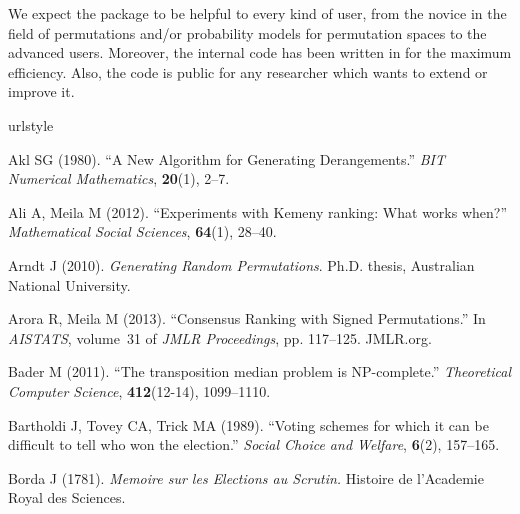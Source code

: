 \documentclass[article,nojss]{jss}
\begin{document}
We expect the  package to be helpful to every kind of user, from the novice in the field of permutations and/or probability models for permutation spaces to the advanced users. Moreover, the internal code has been written in  for the maximum efficiency. Also, the code is public for any researcher which wants to extend or improve it. 



%
%

\begin{thebibliography}{44}
\newcommand{\enquote}[1]{``#1''}
\providecommand{\natexlab}[1]{#1}
\providecommand{\url}[1]{}
\providecommand{\urlprefix}{}
\expandafter\ifx\csname urlstyle\endcsname\relax
  \providecommand{\doi}[1]{doi:\discretionary{}{}{}#1}\else
  \providecommand{\doi}{doi:\discretionary{}{}{}\begingroup
  \urlstyle{rm}\Url}\fi
\providecommand{\eprint}[2][]{\url{#2}}

Akl SG (1980).
\newblock \enquote{{A New Algorithm for Generating Derangements}.}
\newblock \emph{BIT Numerical Mathematics}, \textbf{20}(1), 2--7.

Ali A, Meila M (2012).
\newblock \enquote{{Experiments with Kemeny ranking: What works when?}}
\newblock \emph{Mathematical Social Sciences}, \textbf{64}(1), 28--40.

Arndt J (2010).
\newblock \emph{{Generating Random Permutations}}.
\newblock Ph.D. thesis, Australian National University.

Arora R, Meila M (2013).
\newblock \enquote{{Consensus Ranking with Signed Permutations}.}
\newblock In \emph{AISTATS}, volume~31 of \emph{JMLR Proceedings}, pp.
  117--125. JMLR.org.

Bader M (2011).
\newblock \enquote{{The transposition median problem is NP-complete.}}
\newblock \emph{Theoretical Computer Science}, \textbf{412}(12-14), 1099--1110.

Bartholdi J, Tovey CA, Trick MA (1989).
\newblock \enquote{{Voting schemes for which it can be difficult to tell who
  won the election}.}
\newblock \emph{Social Choice and Welfare}, \textbf{6}(2), 157--165.

Borda J (1781).
\newblock \emph{{Memoire sur les Elections au Scrutin.}}
\newblock Histoire de l'Academie Royal des Sciences.


\end{thebibliography}
\end{document}
